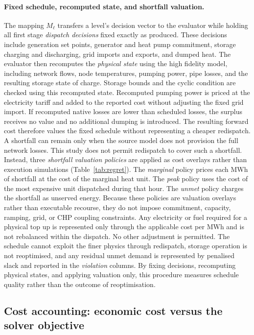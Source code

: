 \documentclass[a4paper,fleqn]{cas-sc}
\providecommand{\DIFaddend}{} %
\DeclareRobustCommand{\DIFaddend}{\DIFOaddend \let\includegraphics\DIFOincludegraphics} %
\begin{document}
\DIFaddend \paragraph{Fixed schedule, recomputed state, and shortfall valuation.}
The mapping $M_\ell$ transfers a level's decision vector to 
the evaluator while holding all first stage \emph{dispatch decisions} 
fixed exactly as produced. These decisions include generation set points, 
generator and heat pump commitment, storage charging and discharging, grid imports and exports, 
and dumped heat. The evaluator then recomputes the \emph{physical state} using the high fidelity 
model, including network flows, node temperatures, pumping power, pipe losses, and the resulting 
storage state of charge. Storage bounds and the cyclic condition are checked using this recomputed 
state. Recomputed pumping power is priced at the electricity tariff and added to the reported cost 
without adjusting the fixed grid import. If recomputed native losses are lower than scheduled losses,
 the surplus receives no value and no additional dumping is introduced. The resulting forward cost 
 therefore values the fixed schedule without representing a cheaper redispatch. A shortfall can 
 remain only when the source model does not provision the full network losses. This study does 
 not permit redispatch to cover such a shortfall. Instead, three \emph{shortfall valuation policies}
  are applied as cost overlays rather than execution simulations (Table~\ref{tab:regret}). 
  The \emph{marginal} policy prices each MWh of shortfall at the cost of the marginal heat unit. 
  The \emph{peak} policy uses the cost of the most expensive unit dispatched during that hour. 
  The \emph{unmet} policy charges the shortfall as unserved energy. 
  Because these policies are valuation overlays rather than executable recourse, 
  they do not impose commitment, capacity, ramping, grid, or CHP coupling constraints. 
  Any electricity or fuel required for a physical top up is represented only through the 
  applicable cost per MWh and is not rebalanced within the dispatch. No other adjustment 
  is permitted. The schedule cannot exploit the finer physics through redispatch, storage 
  operation is not reoptimised, and any residual unmet demand is represented by penalised 
  slack and reported in the \emph{violation} columns. By fixing decisions, recomputing 
  physical states, and applying valuation only, this procedure measures schedule quality 
  rather than the outcome of reoptimisation.

\subsection{Cost accounting: economic cost versus the solver objective}
\label{subsec:costacct}
\end{document}
